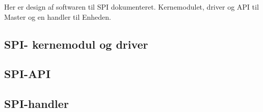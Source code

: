 Her er design af softwaren til SPI dokumenteret. Kernemodulet, driver og API til Master og en handler til Enheden.


\subsection{SPI- kernemodul og driver}



\subsection{SPI-API}




\subsection{SPI-handler}
